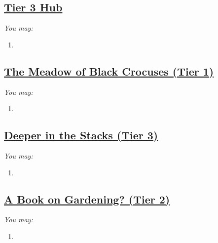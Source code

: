 \documentclass[sheet]{GL2020}
\begin{document}
\clearpage



\begin{center}\section*{\underline{Tier 3 Hub}}\end{center}
\label{TierThreeHub}

\begingroup
\itshape
You may:
\begin{enumerate}[A]
  \item 
\end{enumerate}
\endgroup

\clearpage

\begin{center}\section*{\underline{The Meadow of Black Crocuses (Tier 1)}}\end{center}
\label{MeadowofBlackCrocuses}

\begingroup
\itshape
You may:
\begin{enumerate}[A]
  \item 
\end{enumerate}
\endgroup

\clearpage

\begin{center}\section*{\underline{Deeper in the Stacks (Tier 3)}}\end{center}
\label{DeeperStacks}

\begingroup
\itshape
You may:
\begin{enumerate}[A]
  \item 
\end{enumerate}
\endgroup

\clearpage

\begin{center}\section*{\underline{A Book on Gardening? (Tier 2)}}\end{center}
\label{BookonGardening}

\begingroup
\itshape
You may:
\begin{enumerate}[A]
  \item 
\end{enumerate}
\endgroup
\end{document}
